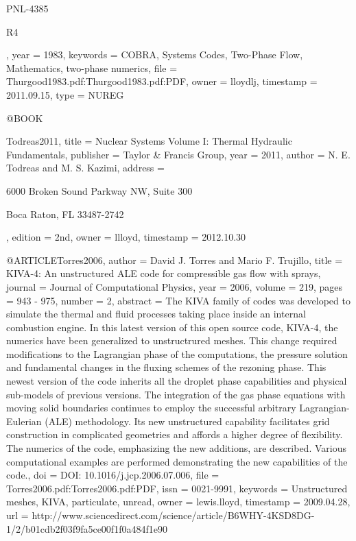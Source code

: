 {{{{	PNL-4385
	
	R4},
  year = {1983},
  keywords = {COBRA, Systems Codes, Two-Phase Flow, Mathematics, two-phase numerics},
  file = {Thurgood1983.pdf:Thurgood1983.pdf:PDF},
  owner = {lloydlj},
  timestamp = {2011.09.15},
  type = {NUREG}
}

@BOOK{Todreas2011,
  title = {Nuclear Systems Volume I: Thermal Hydraulic Fundamentals},
  publisher = {Taylor \& Francis Group},
  year = {2011},
  author = {N. E. Todreas and M. S. Kazimi},
  address = {6000 Broken Sound Parkway NW, Suite 300
	
	Boca Raton, FL 33487-2742},
  edition = {2nd},
  owner = {llloyd},
  timestamp = {2012.10.30}
}

@ARTICLE{Torres2006,
  author = {David J. Torres and Mario F. Trujillo},
  title = {KIVA-4: An unstructured ALE code for compressible gas flow with sprays},
  journal = {Journal of Computational Physics},
  year = {2006},
  volume = {219},
  pages = {943 - 975},
  number = {2},
  abstract = {The KIVA family of codes was developed to simulate the thermal and
	fluid processes taking place inside an internal combustion engine.
	In this latest version of this open source code, KIVA-4, the numerics
	have been generalized to unstructrured meshes. This change required
	modifications to the Lagrangian phase of the computations, the pressure
	solution and fundamental changes in the fluxing schemes of the rezoning
	phase. This newest version of the code inherits all the droplet phase
	capabilities and physical sub-models of previous versions. The integration
	of the gas phase equations with moving solid boundaries continues
	to employ the successful arbitrary Lagrangian-Eulerian (ALE) methodology.
	Its new unstructured capability facilitates grid construction in
	complicated geometries and affords a higher degree of flexibility.
	The numerics of the code, emphasizing the new additions, are described.
	Various computational examples are performed demonstrating the new
	capabilities of the code.},
  doi = {DOI: 10.1016/j.jcp.2006.07.006},
  file = {Torres2006.pdf:Torres2006.pdf:PDF},
  issn = {0021-9991},
  keywords = {Unstructured meshes, KIVA, particulate, unread},
  owner = {lewis.lloyd},
  timestamp = {2009.04.28},
  url = {http://www.sciencedirect.com/science/article/B6WHY-4KSD8DG-1/2/b01cdb2f03f9fa5ce00f1f0a484f1e90}
}

}}
